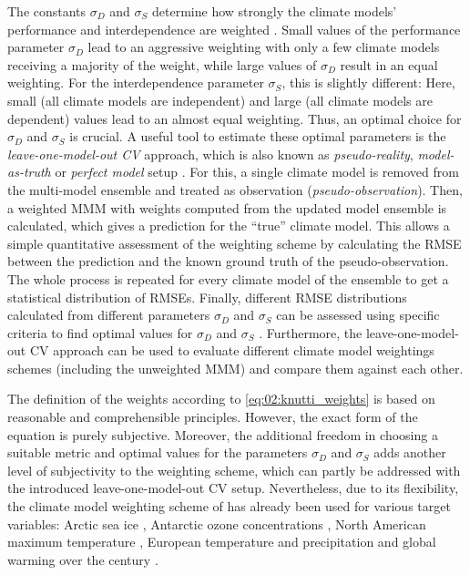 The constants $\sigma_D$ and $\sigma_S$ determine how strongly the climate
models' performance and interdependence are weighted \autocite{Knutti2017a}.
Small values of the performance parameter $\sigma_D$ lead to an aggressive
weighting with only a few climate models receiving a majority of the weight,
while large values of $\sigma_D$ result in an equal weighting. For the
interdependence parameter $\sigma_S$, this is slightly different: Here, small
(all climate models are independent) and large (all climate models are
dependent) values lead to an almost equal weighting. Thus, an optimal choice
for $\sigma_D$ and $\sigma_S$ is crucial. A useful tool to estimate these
optimal parameters is the \emph{leave-one-model-out \ac{CV}} approach, which is
also known as \emph{pseudo-reality}, \emph{model-as-truth} or \emph{perfect
  model} setup \autocite{Elia2002, Karpechko2013}. For this, a single climate
model is removed from the multi-model ensemble and treated as observation
(\emph{pseudo-observation}). Then, a weighted \ac{MMM} with weights computed
from the updated model ensemble is calculated, which gives a prediction for the
\enquote{true} climate model. This allows a simple quantitative assessment of
the weighting scheme by calculating the \ac{RMSE} between the prediction and
the known ground truth of the pseudo-observation. The whole process is repeated
for every climate model of the ensemble to get a statistical distribution of
\acp{RMSE}. Finally, different \ac{RMSE} distributions calculated from
different parameters $\sigma_D$ and $\sigma_S$ can be assessed using specific
criteria to find optimal values for $\sigma_D$ and $\sigma_S$
\autocite{Knutti2017a}. Furthermore, the leave-one-model-out \ac{CV} approach
can be used to evaluate different climate model weightings schemes (including
the unweighted \ac{MMM}) and compare them against each other.

The definition of the weights according to \cref{eq:02:knutti_weights} is based
on reasonable and comprehensible principles. However, the exact form of the
equation is purely subjective. Moreover, the additional freedom in choosing a
suitable metric and optimal values for the parameters $\sigma_D$ and $\sigma_S$
adds another level of subjectivity to the weighting scheme, which can partly be
addressed with the introduced leave-one-model-out \ac{CV} setup. Nevertheless,
due to its flexibility, the climate model weighting scheme of
\textcite{Knutti2017a} has already been used for various target variables:
Arctic sea ice \autocite{Knutti2017a}, Antarctic ozone concentrations
\autocite{Amos2020}, North American maximum temperature \autocite{Lorenz2018},
European temperature and precipitation \autocite{Brunner2019, Merrifield2020}
and global warming over the  century \autocite{Brunner2020,
  Liang2020a}.


